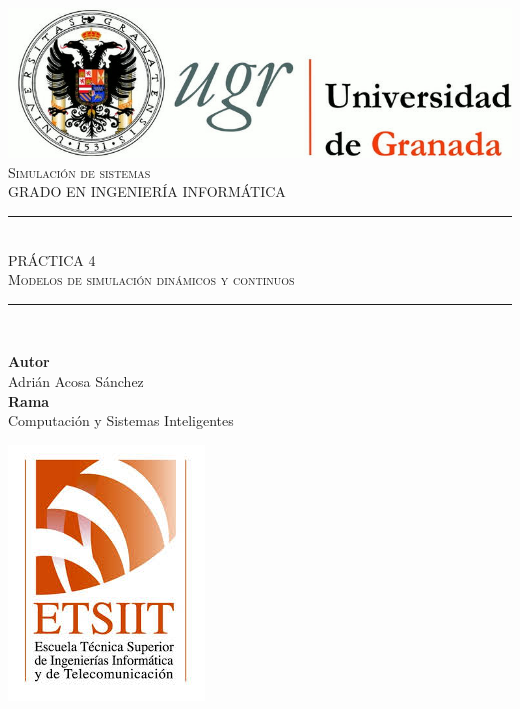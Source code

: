 \documentclass[11pt,a4paper]{report}
\newcommand{\asignatura}{Simulación de sistemas}
\newcommand{\autor}{Adrián Acosa Sánchez}
\newcommand{\titulo}{PRÁCTICA 4}
\newcommand{\subtitulo}{Modelos de simulación dinámicos y continuos}
\newcommand{\rama}{Computación y Sistemas Inteligentes}
\begin{document}

\begin{titlepage}

\begin{minipage}{\textwidth}

\centering

\includegraphics[scale=0.3]{img/logo_ugr.jpg}\\[1cm]

\textsc{\Large \asignatura{}\\[0.2cm]}
\textsc{GRADO EN INGENIERÍA INFORMÁTICA}\\[1cm]

\noindent\rule[-1ex]{\textwidth}{1pt}\\[1.5ex]
\textsc{{\Huge \titulo\\[0.5ex]}}
\textsc{{\Large \subtitulo\\}}
\noindent\rule[-1ex]{\textwidth}{2pt}\\[3.5ex]

\end{minipage}

\vspace{0.7cm}

\begin{minipage}{\textwidth}

\centering

\textbf{Autor}\\ {\autor{}}\\[2.5ex]
\textbf{Rama}\\ {\rama}\\[2.5ex]
\vspace{0.3cm}

\includegraphics[scale=0.3]{img/etsiit.jpeg}


\end{minipage}
\end{titlepage}
\end{document}
